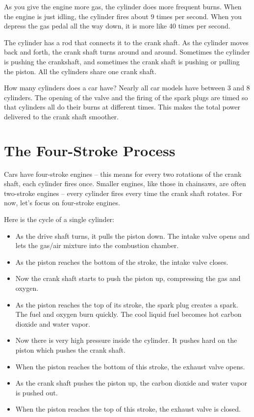 As you give the engine more gas,  the cylinder does more frequent burns.  When the engine is just idling,  the cylinder fires about 9 times per second.  When you depress the gas pedal all the way down,  it is more like 40 times per second.

The cylinder has a rod that connects it to the crank shaft.   As the cylinder moves back and forth,  the crank shaft turns around and around.  Sometimes the cylinder is pushing the crankshaft, and sometimes the crank shaft is pushing or pulling the piston.  All the cylinders share one crank shaft.

How many cylinders does a car have?  Nearly all car models have between 3 and 8 cylinders.    The opening of the valve and the firing of the spark plugs are timed so that cylinders all do their burns 
at different times.   This makes the total power delivered to the crank shaft smoother.

\section{The Four-Stroke Process}

Cars have four-stroke engines -- this means for every two rotations of the crank shaft,  each cylinder fires once.  Smaller engines, like those in chainsaws,  are often two-stroke engines -- every cylinder fires every time the crank shaft rotates.  For now,  let's focus on four-stroke engines.

Here is the cycle of a single cylinder:
\begin{itemize}
\item As the drive shaft turns,  it pulls the piston down.  The intake valve opens and lets the gas/air mixture into the combustion chamber.
\item As the piston reaches the bottom of the stroke,  the intake valve closes.
\item Now the crank shaft starts to push the piston up, compressing the gas and oxygen.
\item As the piston reaches the top of its stroke,  the spark plug creates a spark.  The fuel and oxygen burn quickly.  The cool liquid fuel becomes hot carbon dioxide and water vapor.
\item Now there is very high pressure inside the cylinder.  It pushes hard on the piston which pushes  the crank shaft.
\item When the piston reaches the bottom of this stroke,  the exhaust valve opens.
\item As the crank shaft pushes the piston up,  the carbon dioxide and water vapor is pushed out.
\item When the piston reaches the top of this stroke,  the exhaust valve is closed.
\end{itemize}


